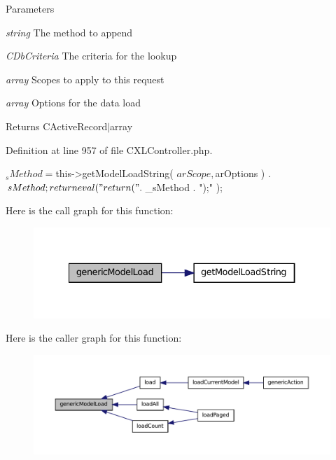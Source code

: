 \begin{DoxyParams}{Parameters}
\item[{\em string}]The method to append \item[{\em CDbCriteria}]The criteria for the lookup \item[{\em array}]Scopes to apply to this request \item[{\em array}]Options for the data load \end{DoxyParams}
\begin{DoxyReturn}{Returns}
CActiveRecord$|$array 
\end{DoxyReturn}


Definition at line 957 of file CXLController.php.




\begin{DoxyCode}
  {
    $_sMethod = $this->getModelLoadString( $arScope, $arOptions ) . $sMethod;
    return eval( "return (" . $_sMethod . ");" );
  }
\end{DoxyCode}




Here is the call graph for this function:\nopagebreak
\begin{figure}[H]
\begin{center}
\leavevmode
\includegraphics[width=334pt]{classCXLController_aacb2f651978f6aa962de80bc0248b3d9_cgraph}
\end{center}
\end{figure}




Here is the caller graph for this function:\nopagebreak
\begin{figure}[H]
\begin{center}
\leavevmode
\includegraphics[width=400pt]{classCXLController_aacb2f651978f6aa962de80bc0248b3d9_icgraph}
\end{center}
\end{figure}


